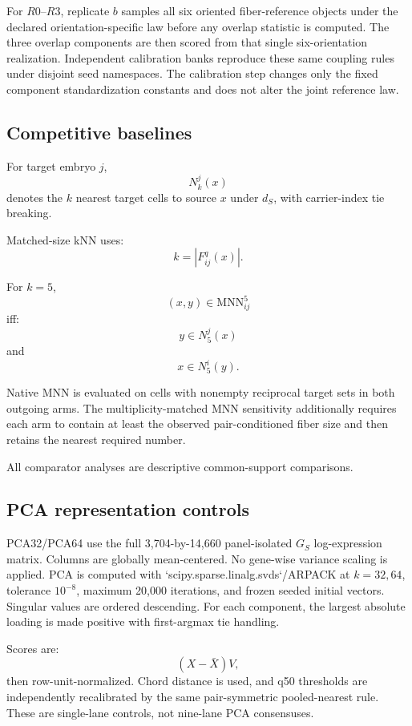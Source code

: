 \documentclass[11pt]{article}
\begin{document}
For \(R0\)--\(R3\), replicate \(b\) samples all six oriented fiber-reference objects under the declared orientation-specific law before any overlap statistic is computed. The three overlap components are then scored from that single six-orientation realization. Independent calibration banks reproduce these same coupling rules under disjoint seed namespaces. The calibration step changes only the fixed component standardization constants and does not alter the joint reference law.

\subsection{Competitive baselines}

For target embryo \(j\),
\[
N_k^j(x)
\]
denotes the \(k\) nearest target cells to source \(x\) under \(d_S\), with carrier-index tie breaking.

Matched-size kNN uses:
\[
k=|F_{ij}^q(x)|.
\]

For \(k=5\),
\[
(x,y)\in\mathrm{MNN}_{ij}^5
\]
iff:
\[
y\in N_5^j(x)
\]
and
\[
x\in N_5^i(y).
\]

Native MNN is evaluated on cells with nonempty reciprocal target sets in both outgoing arms. The multiplicity-matched MNN sensitivity additionally requires each arm to contain at least the observed pair-conditioned fiber size and then retains the nearest required number.

All comparator analyses are descriptive common-support comparisons.

\subsection{PCA representation controls}

PCA32/PCA64 use the full 3,704-by-14,660 panel-isolated \(G_S\) log-expression matrix. Columns are globally mean-centered. No gene-wise variance scaling is applied. PCA is computed with `scipy.sparse.linalg.svds`/ARPACK at \(k=32,64\), tolerance \(10^{-8}\), maximum 20,000 iterations, and frozen seeded initial vectors. Singular values are ordered descending. For each component, the largest absolute loading is made positive with first-argmax tie handling.

Scores are:
\[
(X-\bar X)V,
\]
then row-unit-normalized. Chord distance is used, and q50 thresholds are independently recalibrated by the same pair-symmetric pooled-nearest rule. These are single-lane controls, not nine-lane PCA consensuses.
\end{document}
